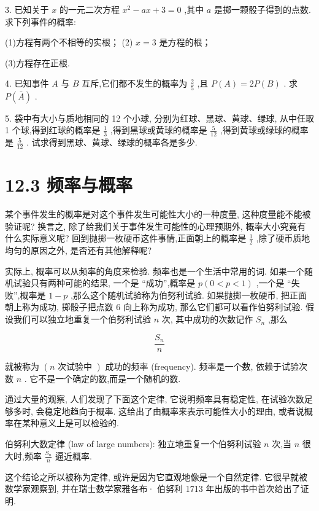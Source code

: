 \documentclass[10pt]{article}
\begin{document}
3. 已知关于 \(x\) 的一元二次方程 \({x}^{2} - {ax} + 3 = 0\) ,其中 \(a\) 是掷一颗骰子得到的点数. 求下列事件的概率:

(1)方程有两个不相等的实根； (2) \(x = 3\) 是方程的根；

(3)方程存在正根.

4. 已知事件 \(A\) 与 \(B\) 互斥,它们都不发生的概率为 \(\frac{2}{5}\) ,且 \(P\left( A\right)  = {2P}\left( B\right)\) . 求 \(P\left( \bar{A}\right)\) .

5. 袋中有大小与质地相同的 12 个小球, 分别为红球、黑球、黄球、绿球, 从中任取 1 个球,得到红球的概率是 \(\frac{1}{3}\) ,得到黑球或黄球的概率是 \(\frac{5}{12}\) ,得到黄球或绿球的概率是 \(\frac{5}{12}\) . 试求得到黑球、黄球、绿球的概率各是多少.



\section*{12.3 频率与概率}

某个事件发生的概率是对这个事件发生可能性大小的一种度量, 这种度量能不能被验证呢? 换言之, 除了给我们关于事件发生可能性的心理预期外, 概率大小究竟有什么实际意义呢? 回到抛掷一枚硬币这件事情,正面朝上的概率是 \(\frac{1}{2}\) ,除了硬币质地均匀的原因之外, 是否还有其他解释呢?

实际上, 概率可以从频率的角度来检验. 频率也是一个生活中常用的词. 如果一个随机试验只有两种可能的结果, 一个是 “成功”,概率是 \(p\left( {0 < p < 1}\right)\) ,一个是 “失败”,概率是 \(1 - p\) ,那么这个随机试验称为伯努利试验. 如果抛掷一枚硬币, 把正面朝上称为成功, 掷骰子把点数 6 向上称为成功, 那么它们都可以看作伯努利试验. 假设我们可以独立地重复一个伯努利试验 \(n\) 次, 其中成功的次数记作 \({S}_{n}\) ,那么

\[
\frac{{S}_{n}}{n}
\]

就被称为 \(\left( {n\text{ 次试验中 }}\right)\) 成功的频率 (frequency). 频率是一个数, 依赖于试验次数 \(n\) . 它不是一个确定的数,而是一个随机的数.

通过大量的观察, 人们发现了下面这个定律, 它说明频率具有稳定性, 在试验次数足够多时, 会稳定地趋向于概率. 这给出了由概率来表示可能性大小的理由, 或者说概率在某种意义上是可以检验的.

伯努利大数定律 (law of large numbers): 独立地重复一个伯努利试验 \(n\) 次,当 \(n\) 很大时,频率 \(\frac{{S}_{n}}{n}\) 逼近概率.

这个结论之所以被称为定律, 或许是因为它直观地像是一个自然定律. 它很早就被数学家观察到, 并在瑞士数学家雅各布· 伯努利 1713 年出版的书中首次给出了证明.
\end{document}
